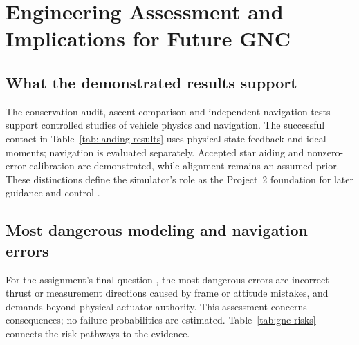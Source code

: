 \section{Engineering Assessment and Implications for Future GNC}
\label{sec:assessment}

\subsection{What the demonstrated results support}
The conservation audit, ascent comparison and independent navigation tests support controlled studies of vehicle physics and navigation. The successful contact in Table~\ref{tab:landing-results} uses physical-state feedback and ideal moments; navigation is evaluated separately. Accepted star aiding and nonzero-error calibration are demonstrated, while alignment remains an assumed prior. These distinctions define the simulator's role as the Project~2 foundation for later guidance and control \cite[slides 2--4]{project2}.

\subsection{Most dangerous modeling and navigation errors}
For the assignment's final question \cite[slide 8]{project2}, the most dangerous errors are incorrect thrust or measurement directions caused by frame or attitude mistakes, and demands beyond physical actuator authority. This assessment concerns consequences; no failure probabilities are estimated. Table~\ref{tab:gnc-risks} connects the risk pathways to the evidence.

